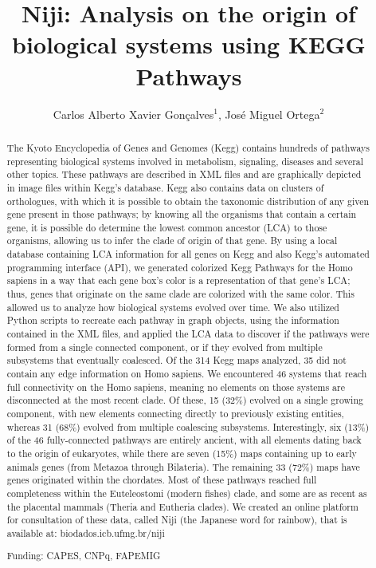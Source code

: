 \documentclass[twoside]{article}
\title{\vspace{-15mm}\fontsize{24pt}{10pt}\selectfont\textbf{Niji: Analysis on the origin of biological systems using KEGG Pathways}} %
\author{Carlos Alberto Xavier Gon\c{c}alves$^1$, Jos\'e Miguel Ortega$^2$}
\affil{1 UFMG\\ 2 UFMG. LABORAT\'ORIO DE BIODADOS\\ }
\date{}
\begin{document}
\maketitle %

\thispagestyle{fancy} %


\begin{abstract}
The Kyoto Encyclopedia of Genes and Genomes (Kegg) contains hundreds of pathways representing biological systems involved in metabolism, signaling, diseases and several other topics. These pathways are described in XML files and are graphically depicted in image files within Kegg's database. Kegg also contains data on clusters of orthologues, with which it is possible to obtain the taxonomic distribution of any given gene present in those pathways; by knowing all the organisms that contain a certain gene, it is possible do determine the lowest common ancestor (LCA) to those organisms, allowing us to infer the clade of origin of that gene. By using a local database containing LCA information for all genes on Kegg and also Kegg's automated programming interface (API), we generated colorized Kegg Pathways for the Homo sapiens in a way that each gene box's color is a representation of that gene's LCA; thus, genes that originate on the same clade are colorized with the same color. This allowed us to analyze how biological systems evolved over time. We also utilized Python scripts to recreate each pathway in graph objects, using the information contained in the XML files, and applied the LCA data to discover if the pathways were formed from a single connected component, or if they evolved from multiple subsystems that eventually coalesced. Of the 314 Kegg maps analyzed, 35 did not contain any edge information on Homo sapiens. We encountered 46 systems that reach full connectivity on the Homo sapiens, meaning no elements on those systems are disconnected at the most recent clade. Of these, 15 (32\%) evolved on a single growing component, with new elements connecting directly to previously existing entities, whereas 31 (68\%) evolved from multiple coalescing subsystems. Interestingly, six (13\%) of the 46 fully-connected pathways are entirely ancient, with all elements dating back to the origin of eukaryotes, while there are seven (15\%) maps containing up to early animals genes (from Metazoa through Bilateria). The remaining 33 (72\%) maps have genes originated within the chordates. Most of these pathways reached full completeness within the Euteleostomi (modern fishes) clade, and some are as recent as the placental mammals (Theria and Eutheria clades). We created an online platform for consultation of these data, called Niji (the Japanese word for rainbow), that is available at: biodados.icb.ufmg.br/niji

Funding: CAPES, CNPq, FAPEMIG
\end{abstract}
\end{document}
